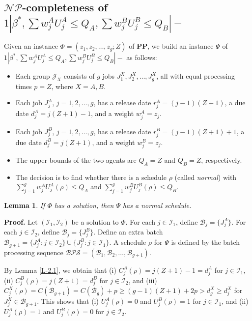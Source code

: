 \documentclass[12pt]{article}
\newtheorem{lemma}{Lemma}[section]
\begin{document}
\begin{sloppypar}
\subsection{$\mathcal{NP}$-completeness of $1 | \beta^{*}, \sum w_j^A U_j^A \leq Q_A, \sum w_j^B U_j^B \leq Q_B|-$}

Given an instance $\Phi=(z_1, z_2, \ldots, z_g; Z)$ of $\mathbf{PP}$, we build an
instance $\Psi$ of $1 | \beta^{*}, \sum w_j^A U_j^A \leq Q_A, \sum w_j^B U_j^B \leq Q_B|-$ as follows:
\begin{itemize}
\item Each group $\mathcal{J}_X$ consists of $g$ jobs $J_1^X, J_2^X, \ldots, J_{g}^X$, all with equal processing times $p=Z$, where $X =A, B$. 

\item Each job $J_j^A$, $j=1, 2, \ldots, g$, has a release date $r_j^A=(j-1) (Z+1)$, a due date $d_j^A=j(Z+1)-1$, and a weight $w_j^A=z_j$.

\item Each job $J_j^B$, $j=1, 2, \ldots, g$, has a release date $r_j^B=(j-1) (Z+1)+1$, a due date $d_j^B=j (Z+1)$, and a weight $w_j^B=z_j$.

\item The upper bounds of the two agents are $Q_A=Z$ and $Q_B=Z$, respectively.

\item The decision is to find whether there is a schedule $\rho$ (called \emph{normal})
with $\sum_{j=1}^g w_j^A U_j^A(\rho) \leq Q_A$ and $\sum_{j=1}^g w_j^B U_j^B(\rho) \leq Q_B$. 
\end{itemize}

\begin{lemma} \label{L-4.3.1}
If $\Phi$ has a solution, then $\Psi$ has a normal schedule.
\end{lemma}
\noindent \textbf{Proof.} Let $(\mathcal{I}_1, \mathcal{I}_2)$ be a solution to $\Phi$.
For each $j \in \mathcal{I}_1$, define $\mathcal{B}_j=\{J_j^A\}$. For each $j \in \mathcal{I}_2$,
define $\mathcal{B}_j=\{J_j^B\}$. Define an extra batch
$\mathcal{B}_{g+1}=\{J_j^A: j \in \mathcal{I}_2\} \cup \{J_j^B: j \in \mathcal{I}_1\} $.
A schedule $\rho$ for $\Psi$ is defined by the batch processing sequence
$\mathcal{BPS}=(\mathcal{B}_1, \mathcal{B}_2, \ldots, \mathcal{B}_{g+1})$.

By Lemma \ref{L-2.1}, we obtain that (i) $C_j^A(\rho)=j(Z+1)-1=d_j^A$ for $j \in \mathcal{I}_1$, (ii) $C_j^B(\rho)=j(Z+1)=d_j^B$ for $j \in \mathcal{I}_2$, and (iii)
$C_j^X(\rho)=C(\mathcal{B}_{g+1})=C(\mathcal{B}_{g})+p \geq (g-1)(Z+1)+2p >d_g^X \geq d_j^X$ for $J_j^X \in \mathcal{B}_{g+1}$. This shows that (i) $U_j^A(\rho)=0$ and $U_j^B(\rho)=1$ for $j \in \mathcal{I}_1$, and (ii) $U_j^A(\rho)=1$ and $U_j^B(\rho)=0$ for $j \in \mathcal{I}_2$.


\end{sloppypar}
\end{document}
